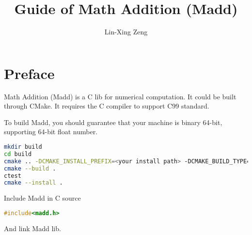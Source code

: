 \documentclass[a4paper, oneside,]{book}
\title{Guide of Math Addition (Madd)}
\author{Lin-Xing Zeng}
\begin{document}
\maketitle
\tableofcontents

\chapter*{Preface}

\indent Math Addition (Madd) is a C lib for numerical computation. It could be built through CMake. It requires the C compiler to support C99 standard.

To build Madd, you should guarantee that your machine is binary 64-bit, supporting 64-bit float number.

\begin{lstlisting}[language=bash, title={Build Madd in source dir.},]
mkdir build
cd build
cmake .. -DCMAKE_INSTALL_PREFIX=<your install path> -DCMAKE_BUILD_TYPE=Release
cmake --build .
ctest
cmake --install .
\end{lstlisting}

Include Madd in C source

\begin{lstlisting}[language=C, title={include Madd header.},]
#include<madd.h>
\end{lstlisting}

And link Madd lib.




\end{document}
